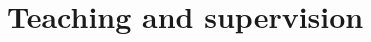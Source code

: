 \documentclass[10pt]{article} %
\begin{document}

\vspace{-\baselineskip}\medskip %


\section{Teaching and supervision}

\end{document}
